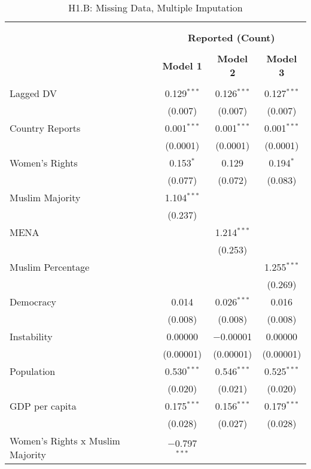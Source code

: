 
\begin{table}[!htbp] \centering 
  \caption{H1.B: Missing Data, Multiple Imputation} 
  \label{} 
\begin{tabular}{@{\extracolsep{5pt}}lccc} 
\\[-1.8ex]\hline \\[-1.8ex] 
\\[-1.8ex] & \multicolumn{3}{c}{\textbf{Reported (Count)}} \\ 
\\[-1.8ex] & \textbf{Model 1} & \textbf{Model 2} & \textbf{Model 3}\\ 
\hline \\[-1.8ex] 
 Lagged DV & 0.129$^{***}$ & 0.126$^{***}$ & 0.127$^{***}$ \\ 
  & (0.007) & (0.007) & (0.007) \\ 
  Country Reports & 0.001$^{***}$ & 0.001$^{***}$ & 0.001$^{***}$ \\ 
  & (0.0001) & (0.0001) & (0.0001) \\ 
  Women's Rights & 0.153$^{*}$ & 0.129 & 0.194$^{*}$ \\ 
  & (0.077) & (0.072) & (0.083) \\ 
  Muslim Majority & 1.104$^{***}$ &  &  \\ 
  & (0.237) &  &  \\ 
  MENA &  & 1.214$^{***}$ &  \\ 
  &  & (0.253) &  \\ 
  Muslim Percentage &  &  & 1.255$^{***}$ \\ 
  &  &  & (0.269) \\ 
  Democracy & 0.014 & 0.026$^{***}$ & 0.016 \\ 
  & (0.008) & (0.008) & (0.008) \\ 
  Instability & 0.00000 & $-$0.00001 & 0.00000 \\ 
  & (0.00001) & (0.00001) & (0.00001) \\ 
  Population & 0.530$^{***}$ & 0.546$^{***}$ & 0.525$^{***}$ \\ 
  & (0.020) & (0.021) & (0.020) \\ 
  GDP per capita & 0.175$^{***}$ & 0.156$^{***}$ & 0.179$^{***}$ \\ 
  & (0.028) & (0.027) & (0.028) \\ 
  Women's Rights x Muslim Majority & $-$0.797$^{***}$ &  &  \\ 

\end{tabular}
\end{table}
